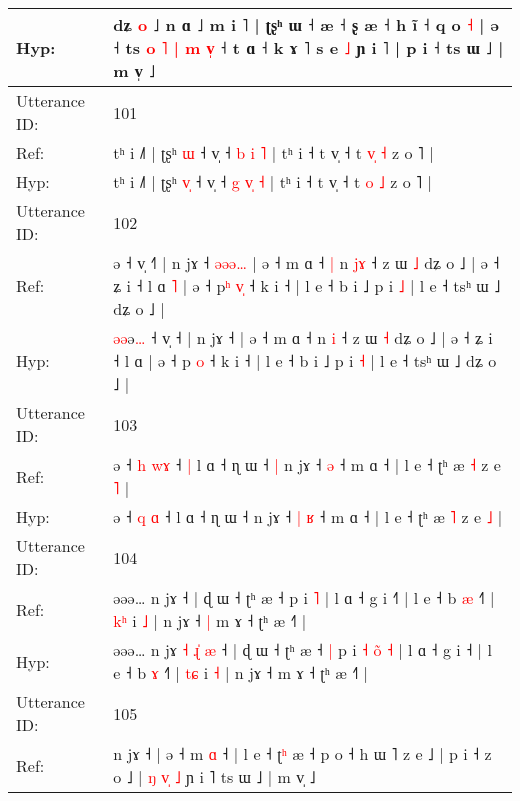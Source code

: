 \documentclass[10pt]{article}
\DeclareRobustCommand{\hl}[1]{{\textcolor{red}{#1}}}
\begin{document}
\begin{longtable}{ll}
 \\
Hyp: & dʑ \hl{o} ˩ n ɑ ˩ m i \hl{}˥ | ʈʂʰ ɯ ˧\hl{}\hl{} \hl{}æ ˧ ʂ \hl{}æ ˧ h ĩ ˧ q o \hl{˧} | ə ˧ ts\hl{}\hl{}\hl{}\hl{} \hl{o} \hl{˥} \hl{|} \hl{m} \hl{}\hl{v}\hl{̩} ˧ t ɑ ˧ k ɤ ˥\hl{}\hl{} s e \hl{˩} ɲ i ˥ | p i ˧ ts ɯ ˩ | m v̩ ˩
 \\
\midrule
Utterance ID: & 101 \\
Ref: & tʰ i ˩˥ | ʈʂʰ \hl{}\hl{ɯ} ˧ v̩ ˧ \hl{b} \hl{}\hl{i} \hl{˥} | tʰ i ˧ t v̩ ˧ t \hl{v}\hl{̩} \hl{˧} z o ˥ |
 \\
Hyp: & tʰ i ˩˥ | ʈʂʰ \hl{v}\hl{̩} ˧ v̩ ˧ \hl{g} \hl{v}\hl{̩} \hl{˧} | tʰ i ˧ t v̩ ˧ t \hl{}\hl{o} \hl{˩} z o ˥ |
 \\
\midrule
Utterance ID: & 102 \\
Ref: & \hl{}\hl{}ə\hl{} ˧ v̩ ˧\hl{˥} | n jɤ ˧\hl{ }\hl{ə}\hl{ə}\hl{ə}\hl{…} | ə ˧ m ɑ ˧\hl{ }\hl{|} n \hl{j}\hl{ɤ} ˧ z ɯ \hl{˩} dʑ o ˩ | ə ˧ ʑ i ˧ l ɑ\hl{ }\hl{˥} | ə ˧ p\hl{ʰ} \hl{v}\hl{̩} ˧ k i ˧ | l e ˧ b i ˩ p i \hl{˩} | l e ˧ tsʰ ɯ ˩ dʑ o ˩ |
 \\
Hyp: & \hl{ə}\hl{ə}ə\hl{…} ˧ v̩ ˧\hl{} | n jɤ ˧\hl{}\hl{}\hl{}\hl{}\hl{} | ə ˧ m ɑ ˧\hl{}\hl{} n \hl{}\hl{i} ˧ z ɯ \hl{˧} dʑ o ˩ | ə ˧ ʑ i ˧ l ɑ\hl{}\hl{} | ə ˧ p\hl{} \hl{}\hl{o} ˧ k i ˧ | l e ˧ b i ˩ p i \hl{˧} | l e ˧ tsʰ ɯ ˩ dʑ o ˩ |
 \\
\midrule
Utterance ID: & 103 \\
Ref: & ə ˧ \hl{h} \hl{w}\hl{ɤ} ˧\hl{ }\hl{|} l ɑ ˧ ɳ ɯ ˧\hl{ }\hl{|} n jɤ ˧\hl{}\hl{} \hl{ə} ˧ m ɑ ˧ | l e ˧ ʈʰ æ \hl{˧} z e \hl{˥} |
 \\
Hyp: & ə ˧ \hl{q} \hl{}\hl{ɑ} ˧\hl{}\hl{} l ɑ ˧ ɳ ɯ ˧\hl{}\hl{} n jɤ ˧\hl{ }\hl{|} \hl{ʁ} ˧ m ɑ ˧ | l e ˧ ʈʰ æ \hl{˥} z e \hl{˩} |
 \\
\midrule
Utterance ID: & 104 \\
Ref: & əəə… n jɤ\hl{}\hl{}\hl{}\hl{}\hl{}\hl{}\hl{} ˧ | ɖ ɯ ˧ ʈʰ æ ˧\hl{}\hl{} p i\hl{}\hl{}\hl{}\hl{}\hl{} \hl{˥} | l ɑ ˧ g i ˧\hl{˥} | l e ˧ b \hl{æ} ˧˥ | \hl{k}\hl{ʰ} i \hl{˩} | n jɤ ˧\hl{ }\hl{|} m ɤ ˧ ʈʰ æ ˧˥ |
 \\
Hyp: & əəə… n jɤ\hl{ }\hl{˧}\hl{ }\hl{ɻ}\hl{̍}\hl{ }\hl{æ} ˧ | ɖ ɯ ˧ ʈʰ æ ˧\hl{ }\hl{|} p i\hl{ }\hl{˧}\hl{ }\hl{o}\hl{̃} \hl{˧} | l ɑ ˧ g i ˧\hl{} | l e ˧ b \hl{ɤ} ˧˥ | \hl{t}\hl{ɕ} i \hl{˧} | n jɤ ˧\hl{}\hl{} m ɤ ˧ ʈʰ æ ˧˥ |
 \\
\midrule
Utterance ID: & 105 \\
Ref: & n jɤ ˧ | ə ˧ m \hl{ɑ} ˧ | l e ˧ ʈ\hl{ʰ} æ ˧ p o ˧ h ɯ ˥ z e ˩ | p i ˧ z o ˩ | \hl{ŋ} \hl{v}\hl{̩} \hl{˩} ɲ i ˥ ts ɯ ˩ | m v̩ ˩
 \\

\end{longtable}
\end{document}
